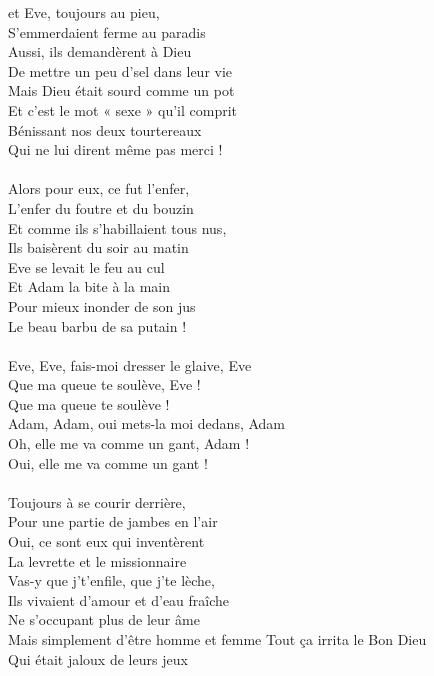 
 et Eve, toujours au pieu, 
\\S'emmerdaient ferme au paradis
\\Aussi, ils demandèrent à Dieu 
\\De mettre un peu d'sel dans leur vie
\\Mais Dieu était sourd comme un pot 
\\Et c'est le mot « sexe » qu'il comprit
\\Bénissant nos deux tourtereaux 
\\Qui ne lui dirent même pas merci !
\\\\Alors pour eux, ce fut l'enfer, 
\\L'enfer du foutre et du bouzin
\\Et comme ils s'habillaient tous nus, 
\\Ils baisèrent du soir au matin
\\Eve se levait le feu au cul 
\\Et Adam la bite à la main
\\Pour mieux inonder de son jus
\\Le beau barbu de sa putain !
\\\\Eve, Eve, fais-moi dresser le glaive, Eve
\\Que ma queue te soulève, Eve !
\\Que ma queue te soulève !
\\Adam, Adam, oui mets-la moi dedans, Adam
\\Oh, elle me va comme un gant, Adam !
\\Oui, elle me va comme un gant !
\\\\Toujours à se courir derrière, 
\\Pour une partie de jambes en l'air
\\Oui, ce sont eux qui inventèrent
\\La levrette et le missionnaire
\\Vas-y que j't'enfile, que j'te lèche, 
\\Ils vivaient d'amour et d'eau fraîche
\\Ne s'occupant plus de leur âme 
\\Mais simplement d'être homme et femme
\breakpage
Tout ça irrita le Bon Dieu 
\\Qui était jaloux de leurs jeux
